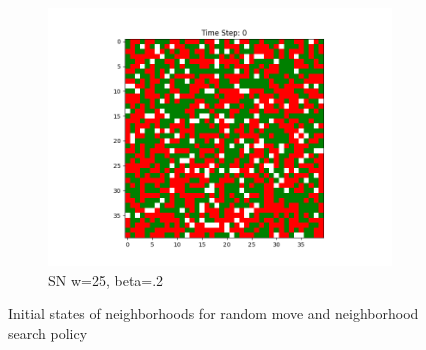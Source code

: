 \documentclass[11pt]{article}
\begin{document}
\begin{figure}[h]
\begin{subfigure}{0.14\textwidth}
			\includegraphics[width=\linewidth]{initial_cluster_w20b20.png}
			\caption{\centering SN w=25, beta=.2}
		\end{subfigure}
		\caption{Initial states of neighborhoods for random move and neighborhood search policy}
	\end{figure}
	\vspace{-2em} %
\end{document}
